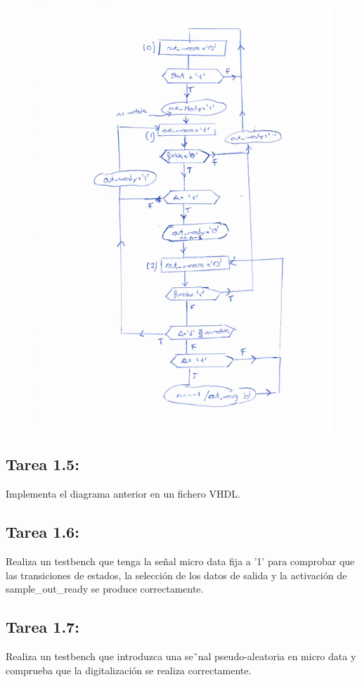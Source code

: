 \documentclass{article}
\begin{document}
\begin{figure}[H]
\centering
\includegraphics[width=0.9\linewidth]{images/1_4.png}
\end{figure}

\subsection{Tarea 1.5:}
Implementa el diagrama anterior en un fichero VHDL.

\subsection{Tarea 1.6:}
Realiza un testbench que tenga la señal micro data fija a '1' para comprobar que las transiciones de estados, la selección de los datos de salida y la activación de sample{\_}out{\_}ready se produce correctamente.

\subsection{Tarea 1.7:}
Realiza un testbench que introduzca una se˜nal pseudo-aleatoria en micro data y comprueba que la digitalización se realiza correctamente.
\end{document}
